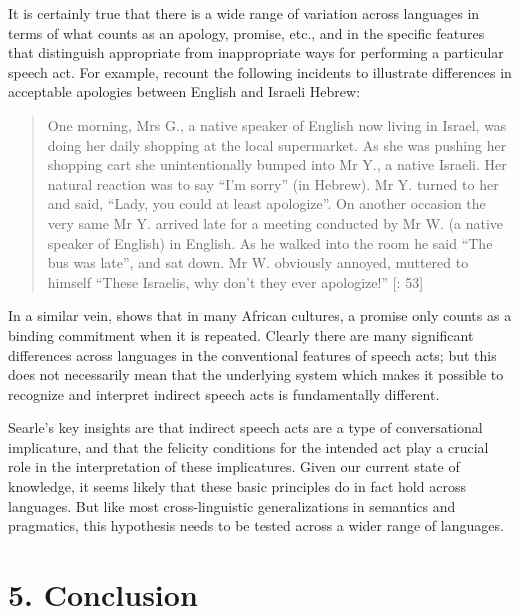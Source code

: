 It is certainly true that there is a wide range of variation across languages in terms of what counts as an apology, promise, etc., and in the specific features that distinguish appropriate from inappropriate ways for performing a particular speech act. For example, \citet{OlshtainCohen1989} recount the following incidents to illustrate differences in acceptable apologies between English and Israeli Hebrew:


\begin{quote}
One morning, Mrs G., a native speaker of English now living in Israel, was doing her daily shopping at the local supermarket. As she was pushing her shopping cart she unintentionally bumped into Mr Y., a native Israeli. Her natural reaction was to say “I’m sorry” (in Hebrew). Mr Y. turned to her and said, “Lady, you could at least apologize”. On another occasion the very same Mr Y. arrived late for a meeting conducted by Mr W. (a native speaker of English) in English. As he walked into the room he said “The bus was late”, and sat down. Mr W. obviously annoyed, muttered to himself “These Israelis, why don’t they ever apologize!” [\citealt{OlshtainCohen1989}: 53]
\end{quote}


In a similar vein, \citet{Egner2002} shows that in many African cultures, a promise only counts as a binding commitment when it is repeated. Clearly there are many significant differences across languages in the conventional features of speech acts; but this does not necessarily mean that the underlying system which makes it possible to recognize and interpret indirect speech acts is fundamentally different.



Searle’s key insights are that indirect speech acts are a type of conversational implicature, and that the felicity conditions for the intended act play a crucial role in the interpretation of these implicatures. Given our current state of knowledge, it seems likely that these basic principles do in fact hold across languages. But like most cross-linguistic generalizations in semantics and pragmatics, this hypothesis needs to be tested across a wider range of languages.


\section{5. Conclusion}\label{sec:}


